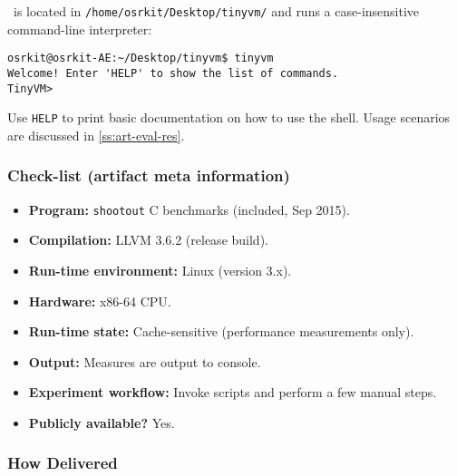 \tinyvm\ is located in {\small\tt /home/osrkit/Desktop/tinyvm/} and runs a case-insensitive command-line interpreter:
\begin{small}
\begin{verbatim}
osrkit@osrkit-AE:~/Desktop/tinyvm$ tinyvm
Welcome! Enter 'HELP' to show the list of commands.
TinyVM> 
\end{verbatim}
\end{small}

\noindent Use {\tt HELP} to print basic documentation on how to use the shell. Usage scenarios are discussed in \ref{ss:art-eval-res}.

\subsubsection{Check-list (artifact meta information)}


{\small
\begin{itemize}[parsep=0pt]
  \item {\bf Program: } {\tt shootout} C benchmarks (included, Sep 2015). %
  \item {\bf Compilation: } LLVM 3.6.2 (release build).
  \item {\bf Run-time environment: } Linux (version 3.x).
  \item {\bf Hardware: } x86-64 CPU.
  \item {\bf Run-time state: } Cache-sensitive (performance measurements only).
  \item {\bf Output: } Measures are output to console.
  \item {\bf Experiment workflow: } Invoke scripts and perform a few manual steps.
  \item {\bf Publicly available?} Yes.
\end{itemize}
}

\subsubsection{How Delivered}

